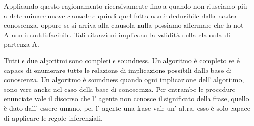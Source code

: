 		Applicando questo ragionamento ricorsivamente fino a quando non riusciamo più a determinare nuove clausole e quindi quel fatto non è deducibile dalla nostra conoscenza, oppure se si arriva alla clausola nulla possiamo affermare che la not A non è soddisfacibile.
		Tali situazioni implicano la validità della clausola di partenza A.
		\par
		Tutti e due algoritmi sono completi e soundness.
		Un algoritmo è completo se é capace di enumerare tutte le relazione di implicazione possibili dalla base di conoscenza.
		Un algoritmo è soundness quando ogni implicazione dell' algoritmo, sono vere anche nel caso della base di conoscenza.
		Per entrambe le procedure enunciate vale il discorso che l' agente non conosce il significato della frase, quello è dato dall' essere umano, per l' agente una frase vale un' altra, esso è solo capace di applicare le regole inferenziali.
		
